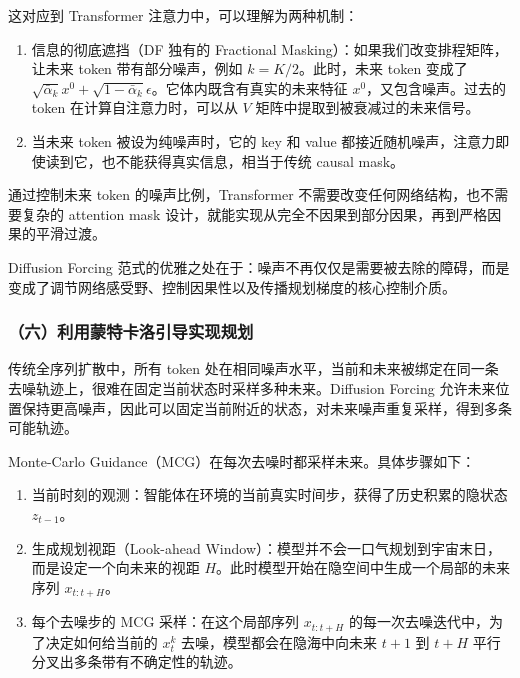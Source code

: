 这对应到 Transformer 注意力中，可以理解为两种机制：

\begin{enumerate}
\def\labelenumi{\arabic{enumi}.}
\tightlist
\item
  信息的彻底遮挡（DF 独有的 Fractional Masking）：如果我们改变排程矩阵，让未来 token 带有部分噪声，例如 \(k=K/2\)。此时，未来 token 变成了 \(\sqrt{\bar{\alpha}_k}x^0+\sqrt{1-\bar{\alpha}_k}\epsilon\)。它体内既含有真实的未来特征 \(x^0\)，又包含噪声。过去的 token 在计算自注意力时，可以从 \(V\) 矩阵中提取到被衰减过的未来信号。
\item
  当未来 token 被设为纯噪声时，它的 key 和 value 都接近随机噪声，注意力即使读到它，也不能获得真实信息，相当于传统 causal mask。
\end{enumerate}

通过控制未来 token 的噪声比例，Transformer 不需要改变任何网络结构，也不需要复杂的 attention mask 设计，就能实现从完全不因果到部分因果，再到严格因果的平滑过渡。

Diffusion Forcing 范式的优雅之处在于：噪声不再仅仅是需要被去除的障碍，而是变成了调节网络感受野、控制因果性以及传播规划梯度的核心控制介质。

\hypertarget{ux516dux5229ux7528ux8499ux7279ux5361ux6d1bux5f15ux5bfcux5b9eux73b0ux89c4ux5212}{%
\subsubsection{（六）利用蒙特卡洛引导实现规划}\label{ux516dux5229ux7528ux8499ux7279ux5361ux6d1bux5f15ux5bfcux5b9eux73b0ux89c4ux5212}}

传统全序列扩散中，所有 token 处在相同噪声水平，当前和未来被绑定在同一条去噪轨迹上，很难在固定当前状态时采样多种未来。Diffusion Forcing 允许未来位置保持更高噪声，因此可以固定当前附近的状态，对未来噪声重复采样，得到多条可能轨迹。

Monte-Carlo Guidance（MCG）在每次去噪时都采样未来。具体步骤如下：

\begin{enumerate}
\def\labelenumi{\arabic{enumi}.}
\tightlist
\item
  当前时刻的观测：智能体在环境的当前真实时间步，获得了历史积累的隐状态 \(z_{t-1}\)。
\item
  生成规划视距（Look-ahead Window）：模型并不会一口气规划到宇宙末日，而是设定一个向未来的视距 \(H\)。此时模型开始在隐空间中生成一个局部的未来序列 \(x_{t:t+H}\)。
\item
  每个去噪步的 MCG 采样：在这个局部序列 \(x_{t:t+H}\) 的每一次去噪迭代中，为了决定如何给当前的 \(x_t^k\) 去噪，模型都会在隐海中向未来 \(t+1\) 到 \(t+H\) 平行分叉出多条带有不确定性的轨迹。
\end{enumerate}

